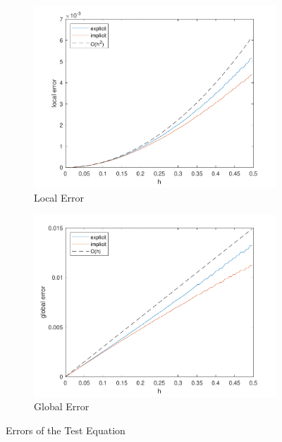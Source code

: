 \begin{figure}[h!]
\centering
    \begin{subfigure}{0.5\linewidth}
        \includegraphics[width=\linewidth]{images/1/1_4_localerror.pdf} 
        \caption{Local Error}
    \end{subfigure}%
    \begin{subfigure}{0.5\linewidth}
        \includegraphics[width=\linewidth]{images/1/1_5_globalerror.pdf}
        \caption{Global Error}
    \end{subfigure}
    \caption{Errors of the Test Equation}
    \label{1_4_5_errors}
\end{figure}


